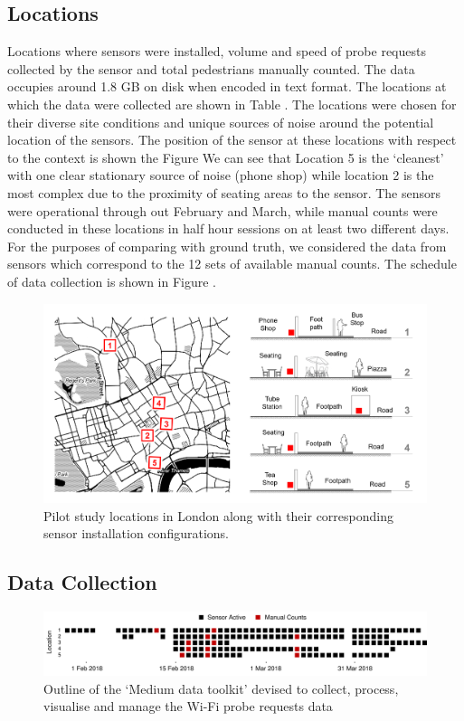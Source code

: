 \subsection{Locations}
Locations where sensors were installed, volume and speed of probe requests collected by the sensor and total pedestrians manually counted.
The data occupies around 1.8 GB on disk when encoded in text format.
The locations at which the data were collected are shown in Table .
The locations were chosen for their diverse site conditions and unique sources of noise around the potential location of the sensors.
The position of the sensor at these locations with respect to the context is shown the Figure 
We can see that Location 5 is the `cleanest' with one clear stationary source of noise (phone shop) while location 2 is the most complex due to the proximity of seating areas to the sensor.
The sensors were operational through out February and March, while manual counts were conducted in these locations in half hour sessions on at least two different days.
For the purposes of comparing with ground truth, we considered the data from sensors which correspond to the 12 sets of available manual counts.
The schedule of data collection is shown in Figure .

\begin{figure}
  \centering
  \includegraphics[trim={20 20 20 20},clip, width=\textwidth]{images/pilot-study-locations.png}
  \caption{Pilot study locations in London along with their corresponding sensor installation configurations.}
  \label{figure:literature:tech:timeline}
\end{figure}

\subsection{Data Collection}

\begin{figure}
  \includegraphics{images/pilot-study-schedule.png}
  \caption{Outline of the `Medium data toolkit' devised to collect, process, visualise and manage the Wi-Fi probe requests data}
  \label{figure:literature:tech:timeline}
\end{figure}

